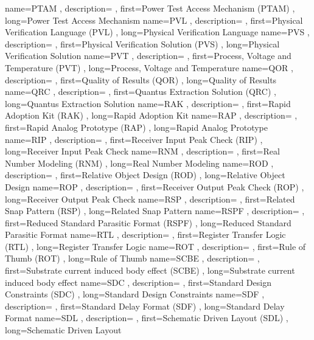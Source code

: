 { name={PTAM}
, description={}
, first={Power Test Access Mechanism (PTAM)}
, long={Power Test Access Mechanism}
}
{ name={PVL}
, description={}
, first={Physical Verification Language (PVL)}
, long={Physical Verification Language}
}
{ name={PVS}
, description={}
, first={Physical Verification Solution (PVS)}
, long={Physical Verification Solution}
}
{ name={PVT}
, description={}
, first={Process, Voltage and Temperature (PVT)}
, long={Process, Voltage and Temperature}
}
{ name={QOR}
, description={}
, first={Quality of Results (QOR)}
, long={Quality of Results}
}
{ name={QRC}
, description={}
, first={Quantus Extraction Solution (QRC)}
, long={Quantus Extraction Solution}
}
{ name={RAK}
, description={}
, first={Rapid Adoption Kit (RAK)}
, long={Rapid Adoption Kit}
}
{ name={RAP}
, description={}
, first={Rapid Analog Prototype (RAP)}
, long={Rapid Analog Prototype}
}
{ name={RIP}
, description={}
, first={Receiver Input Peak Check (RIP)}
, long={Receiver Input Peak Check}
}
{ name={RNM}
, description={}
, first={Real Number Modeling (RNM)}
, long={Real Number Modeling}
}
{ name={ROD}
, description={}
, first={Relative Object Design (ROD)}
, long={Relative Object Design}
}
{ name={ROP}
, description={}
, first={Receiver Output Peak Check (ROP)}
, long={Receiver Output Peak Check}
}
{ name={RSP}
, description={}
, first={Related Snap Pattern (RSP)}
, long={Related Snap Pattern}
}
{ name={RSPF}
, description={}
, first={Reduced Standard Parasitic Format (RSPF)}
, long={Reduced Standard Parasitic Format}
}
{ name={RTL}
, description={}
, first={Register Transfer Logic (RTL)}
, long={Register Transfer Logic}
}
{ name={ROT}
, description={}
, first={Rule of Thumb (ROT)}
, long={Rule of Thumb}
}
{ name={SCBE}
, description={}
, first={Substrate current induced body effect (SCBE)}
, long={Substrate current induced body effect}
}
{ name={SDC}
, description={}
, first={Standard Design Constraints (SDC)}
, long={Standard Design Constraints}
}
{ name={SDF}
, description={}
, first={Standard Delay Format (SDF)}
, long={Standard Delay Format}
}
{ name={SDL}
, description={}
, first={Schematic Driven Layout (SDL)}
, long={Schematic Driven Layout}
}
